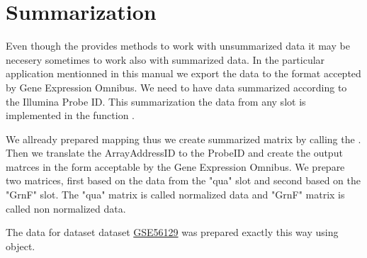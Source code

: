 \section{Summarization}
Even though the  provides methods to work with unsummarized data it may be necesery sometimes to work also with summarized data. In the particular application mentionned in this manual we export the data to the format accepted by Gene Expression Omnibus. We need to have data summarized according to the Illumina Probe ID. This summarization the data from any slot is implemented in the function .

We allready prepared  mapping thus we create summarized matrix by calling the . Then we translate the ArrayAddressID to the ProbeID and create the output matrces in the form acceptable by the Gene Expression Omnibus. We prepare two matrices, first based on the data from the "qua" slot and second based on the "GrnF" slot. The "qua" matrix is called normalized data and "GrnF" matrix is called non normalized data.

The data for dataset dataset \href{http://www.ncbi.nlm.nih.gov/geo/query/acc.cgi?acc=GSE56129}{GSE56129} was prepared exactly this way using  object.